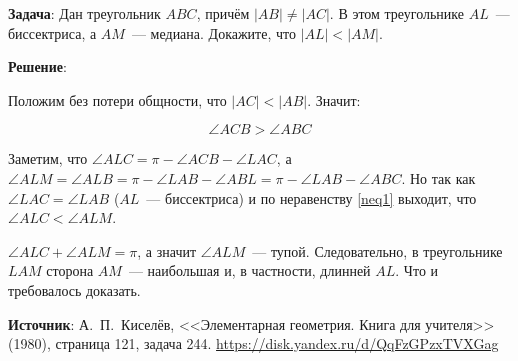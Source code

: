 \documentclass{article} %
\begin{document}
\textbf{Задача}: Дан треугольник $ABC$, причём $|AB| \neq |AC|$. В этом треугольнике $AL$~--- биссектриса, а $AM$~--- медиана. Докажите, что $|AL| < |AM|$. 

\clearpage

\textbf{Решение}: 

\begin{center}
\end{center}

Положим без потери общности, что $|AC| < |AB|$. Значит:

\begin{equation}
  \angle ACB > \angle ABC \label{neq1}
\end{equation}

Заметим, что $\angle ALC = \pi - \angle ACB - \angle LAC$, а $\angle ALM = \angle ALB = \pi - \angle LAB - \angle ABL = \pi - \angle LAB - \angle ABC$. Но так как $\angle LAC = \angle LAB$ ($AL$~--- биссектриса) и по неравенству \ref{neq1} выходит, что $\angle ALC < \angle ALM$.

$\angle ALC + \angle ALM = \pi$, а значит $\angle ALM$~--- тупой. Следовательно, в треугольнике $LAM$ сторона $AM$~--- наибольшая и, в частности, длинней $AL$. Что и требовалось доказать.

\textbf{Источник}: А.~П.~Киселёв, <<Элементарная геометрия. Книга для учителя>> (1980), страница 121, задача 244. \url{https://disk.yandex.ru/d/QqFzGPzxTVXGag}
\end{document}
